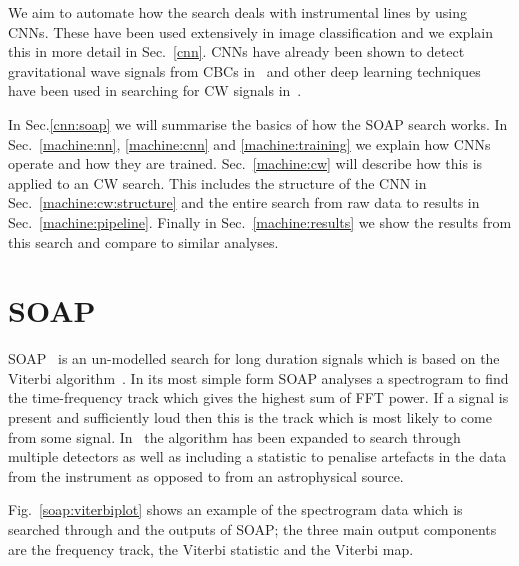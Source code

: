%

We aim to automate how the search deals with instrumental lines by using \glspl{CNN}.
These have been used extensively in image classification and we explain this in
more detail in Sec.~\ref{cnn}. \glspl{CNN}
have already been shown to detect gravitational wave signals from \glspl{CBC}
in~\cite{gabbard2018MatchingMatched,george2018DeepLearning,gebhard2019ConvolutionalNeural}
and other deep learning techniques have been used in searching for \gls{CW}
signals in~\cite{dreissigacker2019DeeplearningContinuous}. 

%
In Sec.\ref{cnn:soap} we will summarise the basics of how the SOAP search works. In
Sec.~\ref{machine:nn}, \ref{machine:cnn} and \ref{machine:training} we explain how \glspl{CNN} operate and how they are trained. Sec.~\ref{machine:cw} will describe how this is applied to an \gls{CW} search. 
This includes the structure of the \gls{CNN} in Sec.~\ref{machine:cw:structure} and the entire search from raw data to results in Sec.~\ref{machine:pipeline}. Finally in Sec.~\ref{machine:results} we
show the results from this search and compare to similar analyses. 

\section{\label{cnn:soap} SOAP}

%
SOAP~\cite{bayley2019SOAPGeneralised} is an un-modelled search for long
duration signals which is based on the Viterbi
algorithm~\cite{viterbi1967ErrorBounds}. In its most simple form SOAP
analyses a spectrogram to find the time-frequency track which gives the highest
sum of \gls{FFT} power. If a signal is present and sufficiently loud then this
is the track which is most likely to come from some signal.
In~\cite{bayley2019SOAPGeneralised} the algorithm has been expanded to
search through multiple detectors as well as including a statistic to penalise
artefacts in the data from the instrument as opposed to from an astrophysical
source. 

%
Fig.~\ref{soap:viterbiplot} shows an example of the spectrogram data which is
searched through and the outputs of SOAP; the three main output components are
the frequency track, the Viterbi statistic and the Viterbi map.

